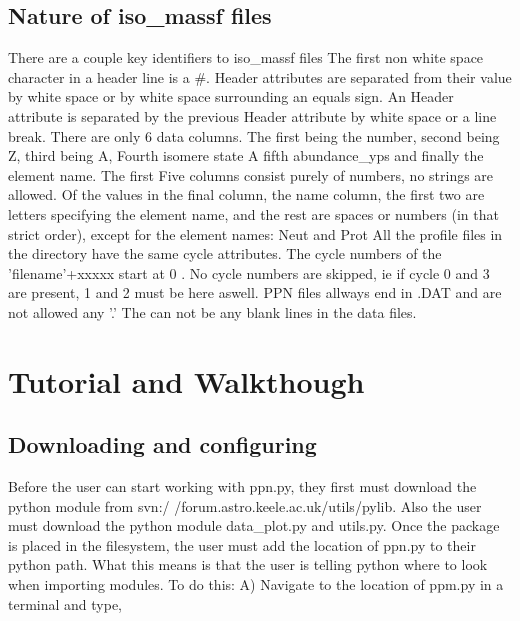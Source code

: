 \subsection{Nature of iso\_massf files}
There are a couple key identifiers to iso\_massf files \newline
The first non white space character in a header line is a \#.\newline
Header attributes are separated from their value by white space or by white space 
	surrounding an equals sign.\newline
An Header attribute is separated by the previous Header attribute by white space
	or a line break.\newline
There are only 6 data columns. The first being the number, second being Z, third being A, Fourth isomere state
	A fifth abundance\_yps and finally the element name.\newline
The first Five columns consist purely of numbers, no strings are allowed.\newline 
Of the values in the final column, the name column, the first two are letters \newline
specifying the element name, and the rest are spaces or numbers (in that strict
order), except for the element names: Neut and Prot\newline
All the profile files in the directory have the same cycle attributes.	\newline
The cycle numbers of the 'filename'+xxxxx start at 0 .\newline
No cycle numbers are skipped, ie if cycle 0 and 3 are present, 1 and 2 must be here aswell.\newline
PPN files allways end in .DAT and are not allowed any '.'\newline
The can not be any blank lines in the data files.\newline

\section{Tutorial and Walkthough}

\subsection{Downloading and configuring}
Before the user can start working with ppn.py, they first must download the python 
module from svn:/ /forum.astro.keele.ac.uk/utils/pylib.  Also the user must download the python module data\_plot.py and utils.py. Once the package is placed in the filesystem, the user must add the location
of ppn.py to their python path.  What this means is that the user is telling python where to look when importing modules.
To do this:
\newline
A) Navigate to the location of ppm.py in a terminal and type,

